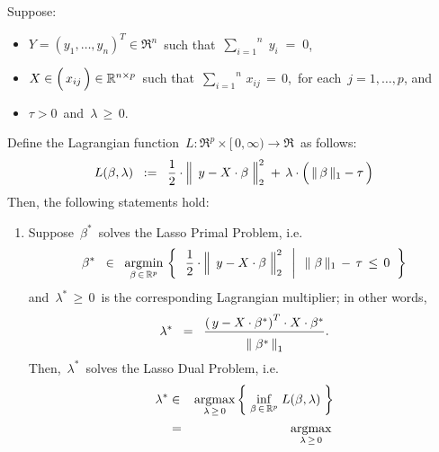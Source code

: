 
\vskip 0.5cm
\begin{theorem}
\mbox{}
\vskip 0.1cm
\noindent
Suppose:
\begin{itemize}
\item
	$Y = (y_{1},\ldots,y_{n})^{T} \in \Re^{n}$\,
	such that
	\,$\overset{n}{\underset{i=1}{\sum}}\;y_{i} \; = \; 0$,\,
\item
	$X \in \left(\,\overset{{\color{white}-}}{x_{ij}}\,\right)\in\Re^{n \times p}$\,
	such that
	\,$\overset{n}{\underset{i=1}{\sum}}\, x_{ij} \, = \, 0$,\,
	for each \,$j = 1,\ldots,p$, and
\item
	$\tau > 0$\, and \,$\lambda \,\geq\, 0$.
\end{itemize}
Define the Lagrangian function
\,$L : \Re^{p} \times [\,0,\infty) \longrightarrow \Re$\,
as follows:
\begin{equation*}
L(\beta,\lambda)
\;\; := \;\;
	\dfrac{1}{2}
	\cdot
	\left\Vert\;\, y \overset{{\color{white}.}}{-} X\cdot\beta \;\right\Vert_{2}^{2}
	\; + \,
	\lambda\cdot\left(\,\Vert\,\beta\,\Vert_{1} \overset{{\color{white}.}}{-} \tau\,\right)
\end{equation*}
Then, the following statements hold:
\begin{enumerate}
\item
	Suppose \,$\beta^{*}$\, solves the Lasso Primal Problem, i.e.
	\begin{equation*}
	\beta^{*}
	\;\; \in \;\;
		\underset{\beta\,\in\,\Re^{p}}{\argmin}\,
		\left\{\;\;
		\left.
		\dfrac{1}{2}
		\cdot
		\left\Vert\;\, y \overset{{\color{white}.}}{-} X\cdot\beta \;\right\Vert_{2}^{2}
		\;\;\,\right\vert\;\;
		\Vert\;\beta\,\Vert_{1} \, - \, \tau \, \leq \, 0
		\;\;\right\}
	\end{equation*}
	and \,$\lambda^{*} \,\geq\, 0$\, is the corresponding Lagrangian multiplier;
	in other words,
	\begin{equation*}
	\lambda^{*}
	\;\; = \;\;
		\dfrac{
			\left(\,y - X\cdot\beta^{*}\right)^{T} \cdot X \cdot \beta^{*}
			}{
			\overset{{\color{white}.}}{\left\Vert\;\beta^{*}\,\right\Vert_{1}}
			}.
	\end{equation*}
	Then, \,$\lambda^{*}$\, solves the Lasso Dual Problem, i.e.
	\begin{eqnarray*}
	\lambda^{*}
	& \in &
		\underset{\lambda\,\geq\,0}{\argmax}
		\left\{\;
			\underset{\beta\,\in\,\Re^{p}}{\inf}\; L(\beta,\lambda)
			\;\right\}
	\\
	& = &
		\underset{\lambda\,\geq\,0}{\argmax}\,

\end{eqnarray*}
\end{enumerate}
\end{theorem}
